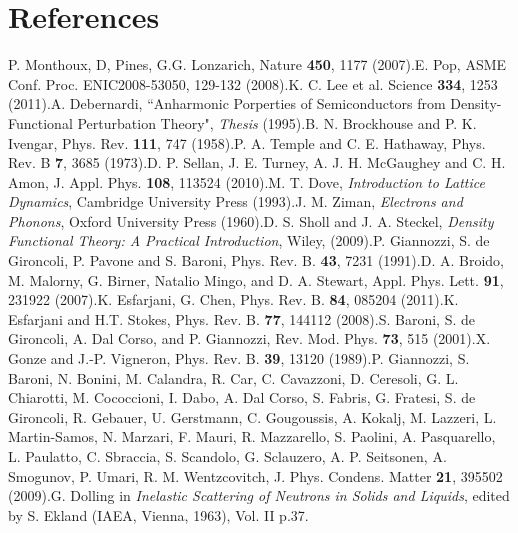 \documentclass{article}
\numberwithin{equation}{section}
\begin{document}
\section{References}
\begin{spacing}{1.0}
\small
\noindent
[1] P. Monthoux, D, Pines, G.G. Lonzarich, Nature \textbf{450}, 1177 (2007).\newline
[2] E. Pop, ASME Conf. Proc. ENIC2008-53050, 129-132 (2008).\newline
[3] K. C. Lee et al. Science \textbf{334}, 1253 (2011).\newline
[4] A. Debernardi, ``Anharmonic Porperties of Semiconductors from Density-Functional Perturbation Theory", \textit{Thesis} (1995).\newline
[5] B. N. Brockhouse and P. K. Ivengar, Phys. Rev. \textbf{111}, 747 (1958).\newline
[6] P. A. Temple and C. E. Hathaway, Phys. Rev. B \textbf{7}, 3685 (1973).\newline
[7] D. P. Sellan, J. E. Turney, A. J. H. McGaughey and C. H. Amon, J. Appl. Phys. \textbf{108}, 113524 (2010).\newline
[8] M. T. Dove, \textit{Introduction to Lattice Dynamics}, Cambridge University Press (1993).\newline
[9] J. M. Ziman, \textit{Electrons and Phonons}, Oxford University Press (1960).\newline
[10] D. S. Sholl and J. A. Steckel, \textit{Density Functional Theory: A Practical Introduction}, Wiley, (2009).\newline
[11] P. Giannozzi, S. de Gironcoli, P. Pavone and S. Baroni, Phys. Rev. B. \textbf{43}, 7231 (1991).\newline
[12] D. A. Broido, M. Malorny, G. Birner, Natalio Mingo, and D. A. Stewart, Appl. Phys. Lett. \textbf{91}, 231922 (2007).\newline
[13] K. Esfarjani, G. Chen, Phys. Rev. B. \textbf{84}, 085204 (2011).\newline
[14] K. Esfarjani and H.T. Stokes, Phys. Rev. B. \textbf{77}, 144112 (2008).\newline
[15] S. Baroni, S. de Gironcoli, A. Dal Corso, and P. Giannozzi, Rev. Mod. Phys. \textbf{73}, 515 (2001).\newline
[16] X. Gonze and J.-P. Vigneron, Phys. Rev. B. \textbf{39}, 13120 (1989).\newline
[17] P. Giannozzi, S. Baroni, N. Bonini, M. Calandra, R. Car, C. Cavazzoni, D. Ceresoli, G. L. Chiarotti, M. Cococcioni, I. Dabo, A. Dal Corso, S. Fabris, G. Fratesi, S. de Gironcoli, R. Gebauer, U. Gerstmann, C. Gougoussis, A. Kokalj, M. Lazzeri, L. Martin-Samos, N. Marzari, F. Mauri, R. Mazzarello, S. Paolini, A. Pasquarello, L. Paulatto, C. Sbraccia, S. Scandolo, G. Sclauzero, A. P. Seitsonen, A. Smogunov, P. Umari, R. M. Wentzcovitch, J. Phys. Condens. Matter \textbf{21}, 395502 (2009).\newline
[18] G. Dolling in \textit{Inelastic Scattering of Neutrons in Solids and Liquids}, edited by S. Ekland (IAEA, Vienna, 1963), Vol. II p.37. \newline


\end{spacing}
\end{document}
